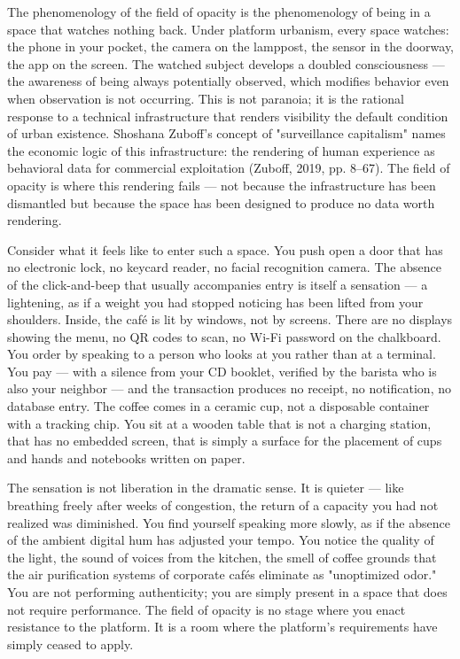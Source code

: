 The phenomenology of the field of opacity is the phenomenology of being in a space that watches nothing back. Under platform urbanism, every space watches: the phone in your pocket, the camera on the lamppost, the sensor in the doorway, the app on the screen. The watched subject develops a doubled consciousness — the awareness of being always potentially observed, which modifies behavior even when observation is not occurring. This is not paranoia; it is the rational response to a technical infrastructure that renders visibility the default condition of urban existence. Shoshana Zuboff's concept of "surveillance capitalism" names the economic logic of this infrastructure: the rendering of human experience as behavioral data for commercial exploitation (Zuboff, 2019, pp. 8–67). The field of opacity is where this rendering fails — not because the infrastructure has been dismantled but because the space has been designed to produce no data worth rendering.

Consider what it feels like to enter such a space. You push open a door that has no electronic lock, no keycard reader, no facial recognition camera. The absence of the click-and-beep that usually accompanies entry is itself a sensation — a lightening, as if a weight you had stopped noticing has been lifted from your shoulders. Inside, the café is lit by windows, not by screens. There are no displays showing the menu, no QR codes to scan, no Wi-Fi password on the chalkboard. You order by speaking to a person who looks at you rather than at a terminal. You pay — with a silence from your CD booklet, verified by the barista who is also your neighbor — and the transaction produces no receipt, no notification, no database entry. The coffee comes in a ceramic cup, not a disposable container with a tracking chip. You sit at a wooden table that is not a charging station, that has no embedded screen, that is simply a surface for the placement of cups and hands and notebooks written on paper.

The sensation is not liberation in the dramatic sense. It is quieter — like breathing freely after weeks of congestion, the return of a capacity you had not realized was diminished. You find yourself speaking more slowly, as if the absence of the ambient digital hum has adjusted your tempo. You notice the quality of the light, the sound of voices from the kitchen, the smell of coffee grounds that the air purification systems of corporate cafés eliminate as "unoptimized odor." You are not performing authenticity; you are simply present in a space that does not require performance. The field of opacity is no stage where you enact resistance to the platform. It is a room where the platform's requirements have simply ceased to apply.

